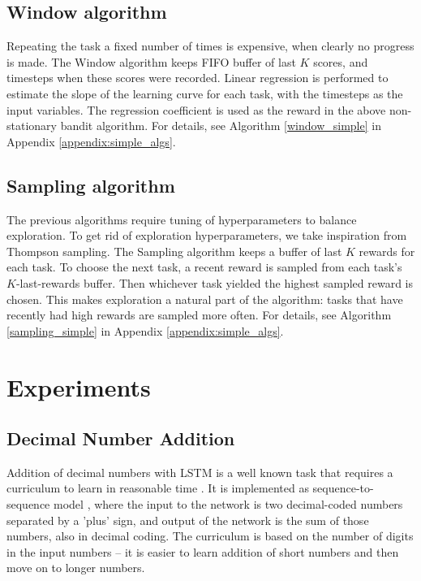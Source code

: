 \documentclass{article}
\begin{document}
\subsection{Window algorithm}

Repeating the task a fixed number of times is expensive, when clearly no progress is made. The Window algorithm keeps FIFO buffer of last $K$ scores, and timesteps when these scores were recorded. Linear regression is performed to estimate the slope of the learning curve for each task, with the timesteps as the input variables. The regression coefficient is used as the reward in the above non-stationary bandit algorithm. For details, see Algorithm \ref{window_simple} in Appendix \ref{appendix:simple_algs}.
  
\subsection{Sampling algorithm}

The previous algorithms require tuning of hyperparameters to balance exploration. To get rid of exploration hyperparameters, we take inspiration from Thompson sampling. The Sampling algorithm keeps a buffer of last $K$ rewards for each task. To choose the next task, a recent reward is sampled from each task's $K$-last-rewards buffer.  Then whichever task yielded the highest sampled reward is chosen. This makes exploration a natural part of the algorithm: tasks that have recently had high rewards are sampled more often. For details, see Algorithm \ref{sampling_simple} in Appendix \ref{appendix:simple_algs}.

\section{Experiments}

\subsection{Decimal Number Addition}

Addition of decimal numbers with LSTM is a well known task that requires a curriculum to learn in reasonable time \citep{Zaremba2014}. It is implemented as sequence-to-sequence model \citep{sutskever2014sequence}, where the input to the network is two decimal-coded numbers separated by a 'plus' sign, and output of the network is the sum of those numbers, also in decimal coding. The curriculum is based on the number of digits in the input numbers -- it is easier to learn addition of short numbers and then move on to longer numbers.
\end{document}
